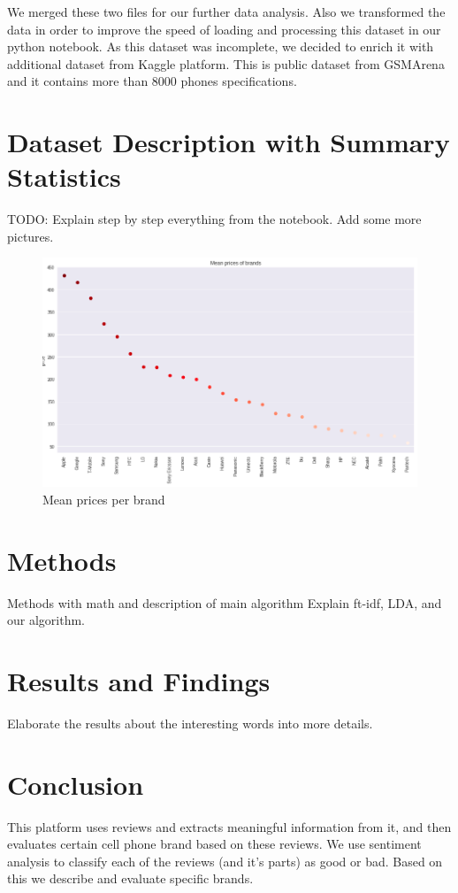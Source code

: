 \documentclass[11pt]{article}
\begin{document}
We merged these two files for our further data analysis. Also we transformed the data in order to improve the speed of loading and processing this dataset in our python notebook. As this dataset was incomplete, we decided to enrich it with additional dataset from Kaggle platform. This is public dataset from GSMArena and it contains more than 8000 phones specifications.


\section{Dataset Description with Summary Statistics}
TODO: Explain step by step everything from the notebook. Add some more pictures. 

\begin{figure}[h!]
  \centering
    \includegraphics[width=\linewidth]{meanPrices.png}
  \caption{Mean prices per brand}
  \label{fig:meanPricePerBrand}
\end{figure}




\section{Methods}
Methods with math and description of main algorithm
Explain ft-idf, LDA, and our algorithm. 

\section{Results and Findings}
Elaborate the results about the interesting words into more details. 


\section{Conclusion}
This platform uses reviews and extracts meaningful information from it, and then evaluates certain cell phone brand based on these reviews. We use sentiment analysis to classify each of the reviews (and it's parts) as good or bad. Based on this we describe and evaluate specific brands. 
\end{document}
